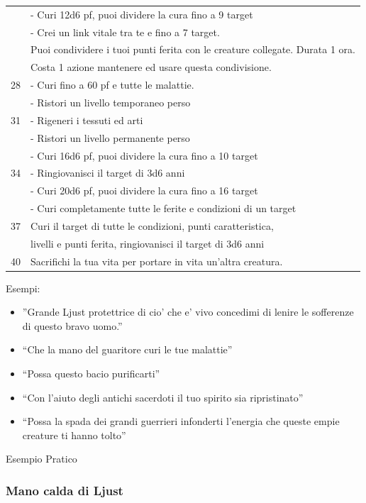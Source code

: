 \documentclass[a4paper,11pt,twoside,openany]{dndbook}
\begin{document}
\begin{tabular}[c]{@{}ll@{}}
& - Curi 12d6 pf, puoi dividere la cura fino a 9 target
\\
& - Crei un link vitale tra te e fino a 7 target.\\
& Puoi condividere i tuoi punti ferita
con le creature collegate. Durata 1 ora. \\
& Costa 1 azione mantenere ed usare
questa condivisione.
\\
28 &- Curi fino a 60 pf e tutte le malattie.
\\
& - Ristori un livello temporaneo perso
\\
31 & - Rigeneri i tessuti ed arti
\\
& - Ristori un livello permanente perso
\\
& - Curi 16d6 pf, puoi dividere la cura fino a 10 target
\\
34 & - Ringiovanisci il target di 3d6 anni
\\
& - Curi 20d6 pf, puoi dividere la cura fino a 16 target
\\
& - Curi completamente tutte le ferite e condizioni di un target
\\
37 & Curi il target di tutte le condizioni, punti caratteristica, \\
& livelli e punti ferita,
 ringiovanisci il target di 3d6 anni\\
40 & Sacrifichi la tua vita per portare in vita un’altra creatura.\\

\bottomrule
\end{tabular}

\bigskip


Esempi:
\begin{itemize}
\item 
''Grande Ljust protettrice di cio' che e' vivo concedimi di lenire
le sofferenze di questo bravo uomo.'' 
\item 
``Che la mano del guaritore curi le tue malattie'' 
\item 
``Possa questo bacio purificarti'' 
\item 
``Con l'aiuto degli antichi sacerdoti il tuo spirito sia ripristinato'' 
\item 
``Possa la spada dei grandi guerrieri infonderti l'energia che queste empie creature ti hanno tolto'' 
\end{itemize}

\bigskip

Esempio Pratico

\subsubsection{Mano calda di Ljust}
\end{document}
